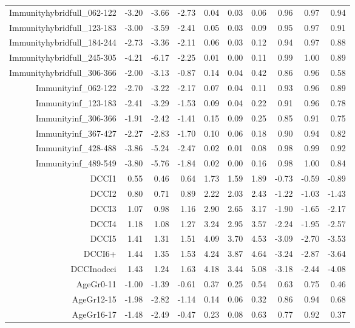 \begin{table}[ht]
\begin{tabular}{rrrrrrrrrr}
  Immunityhybridfull\_062-122 & -3.20 & -3.66 & -2.73 & 0.04 & 0.03 & 0.06 & 0.96 & 0.97 & 0.94 \\ 
  Immunityhybridfull\_123-183 & -3.00 & -3.59 & -2.41 & 0.05 & 0.03 & 0.09 & 0.95 & 0.97 & 0.91 \\ 
  Immunityhybridfull\_184-244 & -2.73 & -3.36 & -2.11 & 0.06 & 0.03 & 0.12 & 0.94 & 0.97 & 0.88 \\ 
  Immunityhybridfull\_245-305 & -4.21 & -6.17 & -2.25 & 0.01 & 0.00 & 0.11 & 0.99 & 1.00 & 0.89 \\ 
  Immunityhybridfull\_306-366 & -2.00 & -3.13 & -0.87 & 0.14 & 0.04 & 0.42 & 0.86 & 0.96 & 0.58 \\ 
  Immunityinf\_062-122 & -2.70 & -3.22 & -2.17 & 0.07 & 0.04 & 0.11 & 0.93 & 0.96 & 0.89 \\ 
  Immunityinf\_123-183 & -2.41 & -3.29 & -1.53 & 0.09 & 0.04 & 0.22 & 0.91 & 0.96 & 0.78 \\ 
  Immunityinf\_306-366 & -1.91 & -2.42 & -1.41 & 0.15 & 0.09 & 0.25 & 0.85 & 0.91 & 0.75 \\ 
  Immunityinf\_367-427 & -2.27 & -2.83 & -1.70 & 0.10 & 0.06 & 0.18 & 0.90 & 0.94 & 0.82 \\ 
  Immunityinf\_428-488 & -3.86 & -5.24 & -2.47 & 0.02 & 0.01 & 0.08 & 0.98 & 0.99 & 0.92 \\ 
  Immunityinf\_489-549 & -3.80 & -5.76 & -1.84 & 0.02 & 0.00 & 0.16 & 0.98 & 1.00 & 0.84 \\ 
  DCCI1 & 0.55 & 0.46 & 0.64 & 1.73 & 1.59 & 1.89 & -0.73 & -0.59 & -0.89 \\ 
  DCCI2 & 0.80 & 0.71 & 0.89 & 2.22 & 2.03 & 2.43 & -1.22 & -1.03 & -1.43 \\ 
  DCCI3 & 1.07 & 0.98 & 1.16 & 2.90 & 2.65 & 3.17 & -1.90 & -1.65 & -2.17 \\ 
  DCCI4 & 1.18 & 1.08 & 1.27 & 3.24 & 2.95 & 3.57 & -2.24 & -1.95 & -2.57 \\ 
  DCCI5 & 1.41 & 1.31 & 1.51 & 4.09 & 3.70 & 4.53 & -3.09 & -2.70 & -3.53 \\ 
  DCCI6+ & 1.44 & 1.35 & 1.53 & 4.24 & 3.87 & 4.64 & -3.24 & -2.87 & -3.64 \\ 
  DCCInodcci & 1.43 & 1.24 & 1.63 & 4.18 & 3.44 & 5.08 & -3.18 & -2.44 & -4.08 \\ 
  AgeGr0-11 & -1.00 & -1.39 & -0.61 & 0.37 & 0.25 & 0.54 & 0.63 & 0.75 & 0.46 \\ 
  AgeGr12-15 & -1.98 & -2.82 & -1.14 & 0.14 & 0.06 & 0.32 & 0.86 & 0.94 & 0.68 \\ 
  AgeGr16-17 & -1.48 & -2.49 & -0.47 & 0.23 & 0.08 & 0.63 & 0.77 & 0.92 & 0.37 \\ 

\end{tabular}
\end{table}
